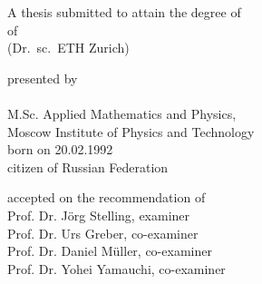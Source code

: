\begin{titlepage}
    \begin{center}
        \large
        \begingroup
        \endgroup

        \hfill

        \vfill

        \begingroup
            \spacedallcaps{\myTitle}
        \endgroup

        \vfill

        \begingroup
            A thesis submitted to attain the degree of\\
            \vspace{0.5em}
            of
             \\
            (Dr.\ sc.\ ETH Zurich)
        \endgroup

        \vfill

        \begingroup
            presented by\\
            \vspace{0.5em}
            \spacedlowsmallcaps{\myName}\\
            M.Sc. Applied Mathematics and Physics,\\
Moscow Institute of Physics and Technology \\
            \vspace{0.5em}
            born on 20.02.1992\\
            citizen of Russian Federation
        \endgroup

        \vfill

        \begingroup
            accepted on the recommendation of\\
            \vspace{0.5em}
            Prof. Dr. Jörg Stelling, examiner\\
            Prof. Dr. Urs Greber, co-examiner\\
            Prof. Dr. Daniel M\"uller, co-examiner\\
            Prof. Dr. Yohei Yamauchi, co-examiner\\
        \endgroup

        \vfill

        \myTime%

        \vfill
    \end{center}
\end{titlepage}

